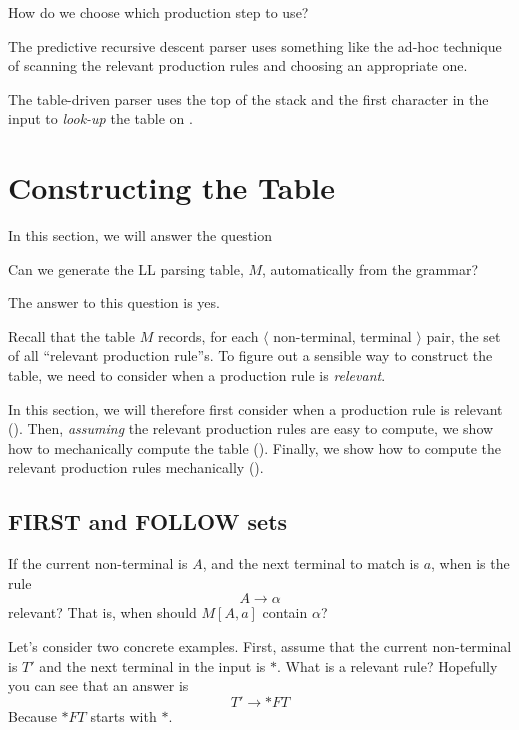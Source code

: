 \begin{center}
    How do we choose which production step to use?
\end{center}

The predictive recursive descent parser uses something like the ad-hoc technique of scanning the relevant production rules and choosing an appropriate one. 

The table-driven parser uses the top of the stack and the first character in the input to \textit{look-up} the table on . 


\section{Constructing the Table}\label{section:building-the-table}
In this section, we will answer the question 
\begin{center}
    Can we generate the LL parsing table, $M$, automatically from the grammar?
\end{center}

The answer to this question is yes. 

Recall that the table $M$ records, for each $\langle$ non-terminal, terminal $\rangle$ pair, the set of all ``relevant production rule''s. To figure out a sensible way to construct the table, we need to consider when a production rule is \textit{relevant}.

In this section, we will therefore first consider when a production rule is relevant (). Then, \textit{assuming} the relevant production rules are easy to compute, we show how to mechanically compute the table (). Finally, we show how to compute the relevant production rules mechanically ().

\subsection{FIRST and FOLLOW sets}\label{section:first-follow-sets}
If the current non-terminal is $A$, and the next terminal to match is $a$, when is the rule 
\[ A \to \alpha \]
relevant? That is, when should $M[A, a]$ contain $\alpha$?

Let's consider two concrete examples. First, assume that the current non-terminal is $T'$ and the next terminal in the input is $*$. What is a relevant rule? Hopefully you can see that an answer is
\[ T' \to *FT \]
Because $*FT$ starts with $*$. 

